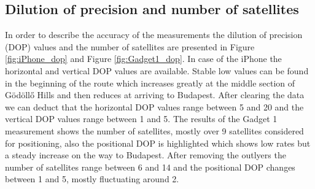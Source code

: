 \documentclass{article}
\begin{document}
		\subsection{Dilution of precision and number of satellites}
			In order to describe the accuracy of the measurements the dilution of precision (DOP) values and the number of satellites are presented in Figure \ref{fig:iPhone_dop} and Figure \ref{fig:Gadget1_dop}. In case of the iPhone the horizontal and vertical DOP values are available. Stable low values can be found in the beginning of the route which increases greatly at the middle section of Gödöllő Hills and then reduces at arriving to Budapest. After clearing the data we can deduct that the horizontal DOP values range between 5 and 20 and the vertical DOP values range between 1 and 5. The results of the Gadget 1 measurement shows the number of satellites, mostly over 9 satellites considered for positioning, also the positional DOP is highlighted which shows low rates but a steady increase on the way to Budapest. After removing the outlyers the number of satellites range between 6 and 14 and the positional DOP changes between 1 and 5, mostly fluctuating around 2.
\end{document}
